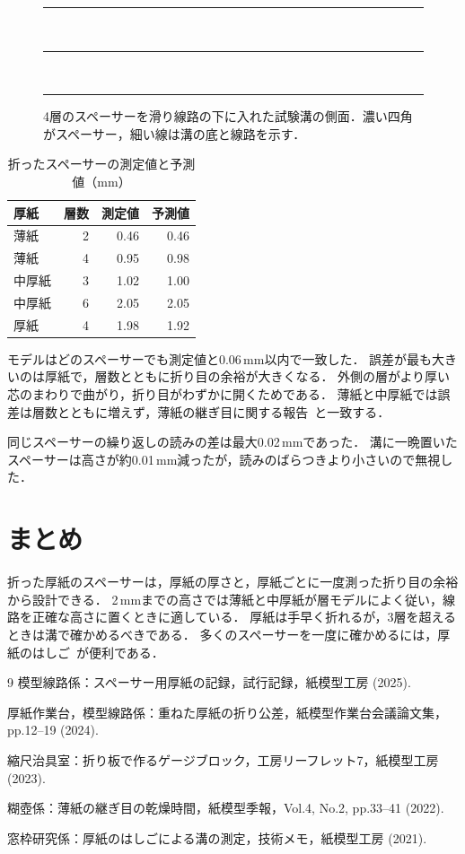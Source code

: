 \documentclass[paper]{ieicej}
\begin{document}
\begin{figure}[t]
\centering
\rule{0.8\linewidth}{0.4pt}\\[2pt]
\rule{0.6\linewidth}{18mm}\\[2pt]
\rule{0.8\linewidth}{0.4pt}
\caption{4層のスペーサーを滑り線路の下に入れた試験溝の側面．濃い四角がスペーサー，細い線は溝の底と線路を示す．}
\label{fig:slot}
\end{figure}

\begin{table}[t]
\caption{折ったスペーサーの測定値と予測値（mm）}
\label{tab:heights}
\centering
\begin{tabular}{lrrr}
\hline
厚紙 & 層数 & 測定値 & 予測値 \\
\hline
薄紙 & 2 & 0.46 & 0.46 \\
薄紙 & 4 & 0.95 & 0.98 \\
中厚紙 & 3 & 1.02 & 1.00 \\
中厚紙 & 6 & 2.05 & 2.05 \\
厚紙 & 4 & 1.98 & 1.92 \\
\hline
\end{tabular}
\end{table}

モデルはどのスペーサーでも測定値と0.06\,mm以内で一致した．
誤差が最も大きいのは厚紙で，層数とともに折り目の余裕が大きくなる．
外側の層がより厚い芯のまわりで曲がり，折り目がわずかに開くためである．
薄紙と中厚紙では誤差は層数とともに増えず，薄紙の継ぎ目に関する報告~\cite{glue22}と一致する．

同じスペーサーの繰り返しの読みの差は最大0.02\,mmであった．
溝に一晩置いたスペーサーは高さが約0.01\,mm減ったが，読みのばらつきより小さいので無視した．

\section{まとめ}\label{sec:conclusion}
折った厚紙のスペーサーは，厚紙の厚さと，厚紙ごとに一度測った折り目の余裕から設計できる．
2\,mmまでの高さでは薄紙と中厚紙が層モデルによく従い，線路を正確な高さに置くときに適している．
厚紙は手早く折れるが，3層を超えるときは溝で確かめるべきである．
多くのスペーサーを一度に確かめるには，厚紙のはしご~\cite{window21}が便利である．

\begin{thebibliography}{9}
模型線路係：スペーサー用厚紙の記録，試行記録，紙模型工房 (2025).

厚紙作業台，模型線路係：重ねた厚紙の折り公差，紙模型作業台会議論文集，pp.12--19 (2024).

縮尺治具室：折り板で作るゲージブロック，工房リーフレット7，紙模型工房 (2023).

糊壺係：薄紙の継ぎ目の乾燥時間，紙模型季報，Vol.4, No.2, pp.33--41 (2022).

窓枠研究係：厚紙のはしごによる溝の測定，技術メモ，紙模型工房 (2021).

\end{thebibliography}
\end{document}
